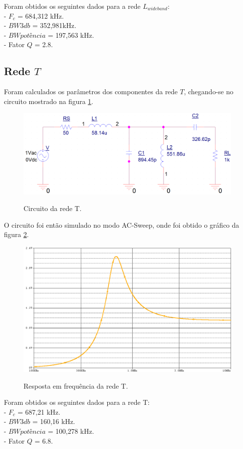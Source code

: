     Foram obtidos os seguintes dados para a rede $L_{wideband}$:\\
    - $F_c$ = 684,312 kHz. \\
    - $BW3db$ = 352,981kHz. \\
    - $BW potência$ = 197,563 kHz. \\
    - Fator $Q$ = 2.8. \\
 
 
 \subsection{Rede $T$}
 
 Foram calculados os parâmetros dos componentes da rede $T$, chegando-se no circuito mostrado na figura \ref{f_sch_rede_T}.
 
 \begin{figure}[H]
     \centering
     \caption{Circuito da rede T.}
     \includegraphics[scale=0.4]{Imagens/sch_rede_T.png}
     \label{f_sch_rede_T}
    \end{figure}
    
    O circuito foi então simulado no modo AC-Sweep, onde foi obtido o gráfico da figura \ref{f_rede_T_graph}.
    
    \begin{figure}[H]
        \centering
        \caption{Resposta em frequência da rede T.}
        \includegraphics[scale=0.4]{Imagens/rede_T_graph.png}
        \label{f_rede_T_graph}
    \end{figure}
    
    Foram obtidos os seguintes dados para a rede T:\\
    - $F_c$ = 687,21 kHz. \\
    - $BW3db$ = 160,16 kHz. \\
    - $BW potência$ = 100,278 kHz. \\
    - Fator $Q$ = 6.8. \\